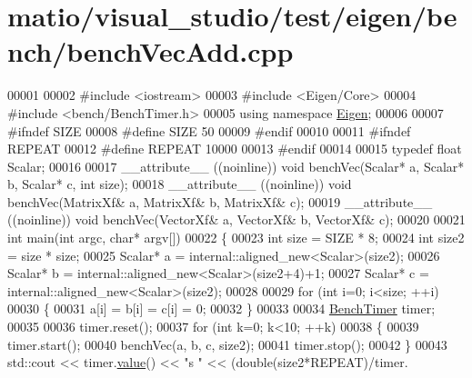 \hypertarget{matio_2visual__studio_2test_2eigen_2bench_2bench_vec_add_8cpp_source}{}\section{matio/visual\+\_\+studio/test/eigen/bench/bench\+Vec\+Add.cpp}
\label{matio_2visual__studio_2test_2eigen_2bench_2bench_vec_add_8cpp_source}

\begin{DoxyCode}
00001 
00002 \textcolor{preprocessor}{#include <iostream>}
00003 \textcolor{preprocessor}{#include <Eigen/Core>}
00004 \textcolor{preprocessor}{#include <bench/BenchTimer.h>}
00005 \textcolor{keyword}{using namespace }\hyperlink{namespace_eigen}{Eigen};
00006 
00007 \textcolor{preprocessor}{#ifndef SIZE}
00008 \textcolor{preprocessor}{#define SIZE 50}
00009 \textcolor{preprocessor}{#endif}
00010 
00011 \textcolor{preprocessor}{#ifndef REPEAT}
00012 \textcolor{preprocessor}{#define REPEAT 10000}
00013 \textcolor{preprocessor}{#endif}
00014 
00015 \textcolor{keyword}{typedef} \textcolor{keywordtype}{float} Scalar;
00016 
00017 \_\_attribute\_\_ ((noinline)) \textcolor{keywordtype}{void} benchVec(Scalar* a, Scalar* b, Scalar* c, \textcolor{keywordtype}{int} size);
00018 \_\_attribute\_\_ ((noinline)) \textcolor{keywordtype}{void} benchVec(MatrixXf& a, MatrixXf& b, MatrixXf& c);
00019 \_\_attribute\_\_ ((noinline)) \textcolor{keywordtype}{void} benchVec(VectorXf& a, VectorXf& b, VectorXf& c);
00020 
00021 \textcolor{keywordtype}{int} main(\textcolor{keywordtype}{int} argc, \textcolor{keywordtype}{char}* argv[])
00022 \{
00023     \textcolor{keywordtype}{int} size = SIZE * 8;
00024     \textcolor{keywordtype}{int} size2 = size * size;
00025     Scalar* a = internal::aligned\_new<Scalar>(size2);
00026     Scalar* b = internal::aligned\_new<Scalar>(size2+4)+1;
00027     Scalar* c = internal::aligned\_new<Scalar>(size2); 
00028     
00029     \textcolor{keywordflow}{for} (\textcolor{keywordtype}{int} i=0; i<size; ++i)
00030     \{
00031         a[i] = b[i] = c[i] = 0;
00032     \}
00033     
00034     \hyperlink{class_eigen_1_1_bench_timer}{BenchTimer} timer;
00035     
00036     timer.reset();
00037     \textcolor{keywordflow}{for} (\textcolor{keywordtype}{int} k=0; k<10; ++k)
00038     \{
00039         timer.start();
00040         benchVec(a, b, c, size2);
00041         timer.stop();
00042     \}
00043     std::cout << timer.\hyperlink{class_eigen_1_1_bench_timer_a26760f963ed8b64c126159bfea57735e}{value}() << \textcolor{stringliteral}{"s  "} << (double(size2*REPEAT)/timer.

\end{DoxyCode}
